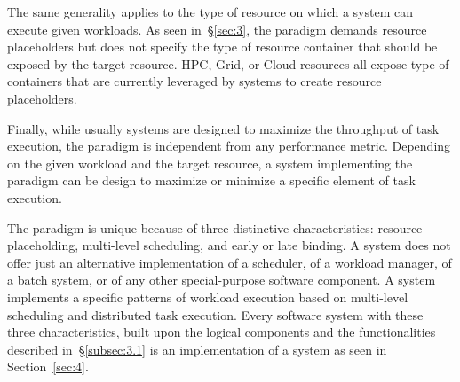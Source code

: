 \documentclass{sig-alternate}
\begin{document}
The same generality applies to the type of resource on which a \pilot
system can execute given workloads. As seen in~\S\ref{sec:3}, the
\pilot paradigm demands resource placeholders but does not specify the
type of resource container that should be exposed by the target
resource. HPC, Grid, or Cloud resources all expose type of containers
that are currently leveraged by \pilot systems to create resource
placeholders.

Finally, while usually \pilot systems are designed to maximize the
throughput of task execution, the \pilot paradigm is independent from
any performance metric. Depending on the given workload and the target
resource, a \pilot system implementing the \pilot paradigm can be design
to maximize or minimize a specific element of task execution.

The \pilot paradigm is unique because of three distinctive
characteristics: resource placeholding, multi-level scheduling, and
early or late binding. A \pilot system does not offer just an
alternative implementation of a scheduler, of a workload manager, of a
batch system, or of any other special-purpose software component. A
\pilot system implements a specific patterns of workload execution based
on multi-level scheduling and distributed task execution. Every software
system with these three characteristics, built upon the logical
components and the functionalities described in~\S\ref{subsec:3.1} is an
implementation of a \pilot system as seen in Section~\ref{sec:4}.



\end{document}
